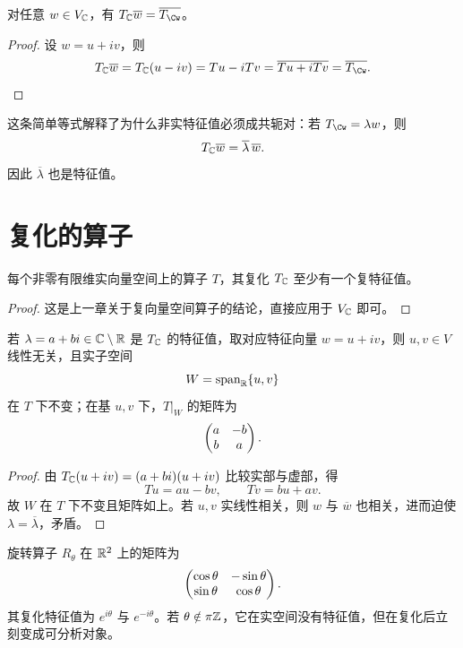 \begin{proposition}
对任意 $w\in V_{\mathbb{C}}$，有 $T_\C\overline{w}=\overline{T_\Cw}$。
\end{proposition}

\begin{proof}
设 $w=u+iv$，则
\[
T_\C\overline{w}=T_\C(u-iv)=Tu-iTv=\overline{Tu+iTv}=\overline{T_\Cw}.
\]
\end{proof}

\begin{remark}
这条简单等式解释了为什么非实特征值必须成共轭对：若 $T_\Cw=\lambda w$，则
\[
T_{\mathbb{C}}\overline{w}=\overline{\lambda}\,\overline{w}.
\]
因此 $\overline{\lambda}$ 也是特征值。
\end{remark}

\section{复化的算子}

\begin{proposition}
每个非零有限维实向量空间上的算子 $T$，其复化 $T_{\mathbb{C}}$ 至少有一个复特征值。
\end{proposition}

\begin{proof}
这是上一章关于复向量空间算子的结论，直接应用于 $V_{\mathbb{C}}$ 即可。
\end{proof}

\begin{proposition}
若 $\lambda=a+bi\in\mathbb{C}\setminus\mathbb{R}$ 是 $T_{\mathbb{C}}$ 的特征值，取对应特征向量 $w=u+iv$，则 $u,v\in V$ 线性无关，且实子空间
\[
W=\operatorname{span}_{\mathbb{R}}\{u,v\}
\]
在 $T$ 下不变；在基 $u,v$ 下，$T|_W$ 的矩阵为
\[
\begin{pmatrix} a&-b\\b&a \end{pmatrix}.
\]
\end{proposition}

\begin{proof}
由 $T_{\mathbb{C}}(u+iv)=(a+bi)(u+iv)$ 比较实部与虚部，得
\[
Tu=au-bv,\qquad Tv=bu+av.
\]
故 $W$ 在 $T$ 下不变且矩阵如上。若 $u,v$ 实线性相关，则 $w$ 与 $\overline{w}$ 也相关，进而迫使 $\lambda=\overline{\lambda}$，矛盾。
\end{proof}

\begin{example}
旋转算子 $R_\theta$ 在 $\mathbb{R}^2$ 上的矩阵为
\[
\begin{pmatrix} \cos\theta&-\sin\theta\\ \sin\theta&\cos\theta \end{pmatrix}.
\]
其复化特征值为 $e^{i\theta}$ 与 $e^{-i\theta}$。若 $\theta\notin\pi\mathbb{Z}$，它在实空间没有特征值，但在复化后立刻变成可分析对象。
\end{example}

